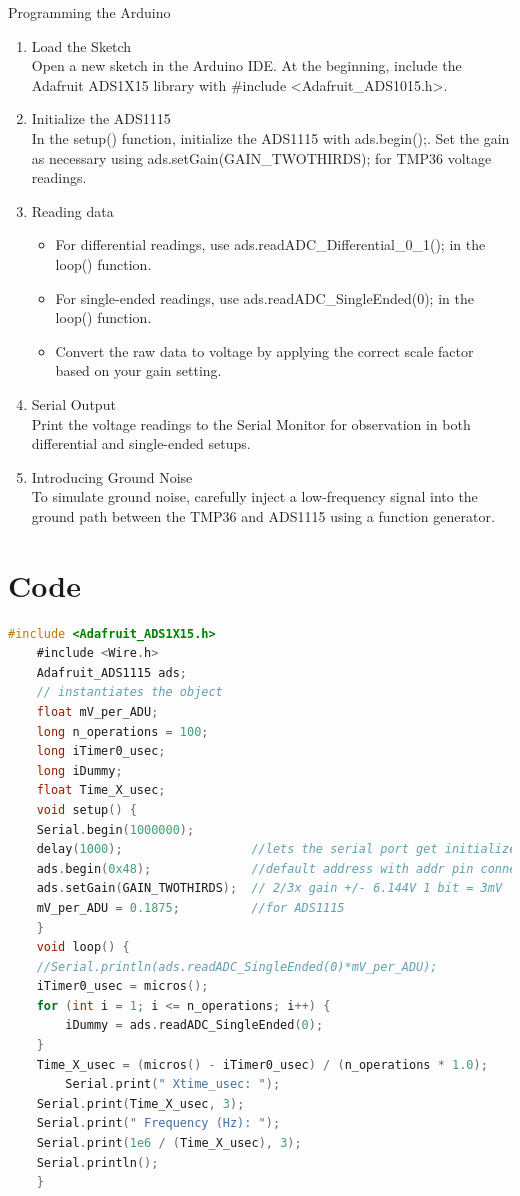 \documentclass[a4paper,11pt]{article}%
\begin{document}
Programming the Arduino
\begin{enumerate}
	\item Load the Sketch\\
	Open a new sketch in the Arduino IDE.
	At the beginning, include the Adafruit ADS1X15 library with \#include <Adafruit\_ADS1015.h>.
	\item Initialize the ADS1115\\
	In the setup() function, initialize the ADS1115 with ads.begin();.
	Set the gain as necessary using ads.setGain(GAIN\_TWOTHIRDS); for TMP36 voltage readings.
	\item Reading data\\
	\begin{itemize}
		\item For differential readings, use ads.readADC\_Differential\_0\_1(); in the loop() function.
		\item For single-ended readings, use ads.readADC\_SingleEnded(0); in the loop() function.
		\item Convert the raw data to voltage by applying the correct scale factor based on your gain setting.
	\end{itemize}
	\item 
	Serial Output\\
	Print the voltage readings to the Serial Monitor for observation in both differential and single-ended setups.
	
	\item Introducing Ground Noise \\
	To simulate ground noise, carefully inject a low-frequency signal into the ground path between the TMP36 and ADS1115 using a function generator.
\end{enumerate}


\section{Code}

\begin{lstlisting}[language=C]
	#include <Adafruit_ADS1X15.h>
	#include <Wire.h>
	Adafruit_ADS1115 ads;
	// instantiates the object
	float mV_per_ADU;
	long n_operations = 100;
	long iTimer0_usec;
	long iDummy;
	float Time_X_usec;
	void setup() {
	Serial.begin(1000000);
	delay(1000);                  //lets the serial port get initialized
	ads.begin(0x48);              //default address with addr pin connected to gnd
	ads.setGain(GAIN_TWOTHIRDS);  // 2/3x gain +/- 6.144V 1 bit = 3mV
	mV_per_ADU = 0.1875;          //for ADS1115
	}
	void loop() {
	//Serial.println(ads.readADC_SingleEnded(0)*mV_per_ADU);
	iTimer0_usec = micros();
	for (int i = 1; i <= n_operations; i++) {
		iDummy = ads.readADC_SingleEnded(0);
	}
	Time_X_usec = (micros() - iTimer0_usec) / (n_operations * 1.0);
		Serial.print(" Xtime_usec: ");
	Serial.print(Time_X_usec, 3);
	Serial.print(" Frequency (Hz): ");
	Serial.print(1e6 / (Time_X_usec), 3);
	Serial.println();
	}
\end{lstlisting}
\end{document}
